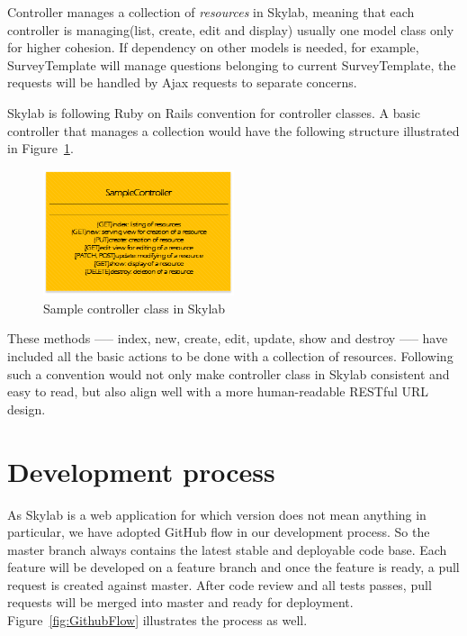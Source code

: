 Controller manages a collection of \textit{resources} in Skylab, meaning that each controller is managing(list, create, edit and display) usually one model class only for higher cohesion. If dependency on other models is needed, for example, SurveyTemplate will manage questions belonging to current SurveyTemplate, the requests will be handled by Ajax requests to separate concerns.

Skylab is following Ruby on Rails convention for controller classes. A basic controller that manages a collection would have the following structure illustrated in Figure~\ref{fig:SkylabSampleController}.

\begin{figure}[h]
  \centering
  \includegraphics[width=0.5\textwidth]{Images/Skylab_Sample_Controller.png}
  \caption{Sample controller class in Skylab}
  \label{fig:SkylabSampleController}
\end{figure}

These methods —-- index, new, create, edit, update, show and destroy —-- have included all the basic actions to be done with a collection of resources. Following such a convention would not only make controller class in Skylab consistent and easy to read, but also align well with a more human-readable RESTful URL design.

\section{Development process}

As Skylab is a web application for which version does not mean anything in particular, we have adopted GitHub flow in our development process\cite{citation8}. So the master branch always contains the latest stable and deployable code base. Each feature will be developed on a feature branch and once the feature is ready, a pull request is created against master. After code review and all tests passes, pull requests will be merged into master and ready for deployment. Figure~\ref{fig:GithubFlow} illustrates the process as well.

